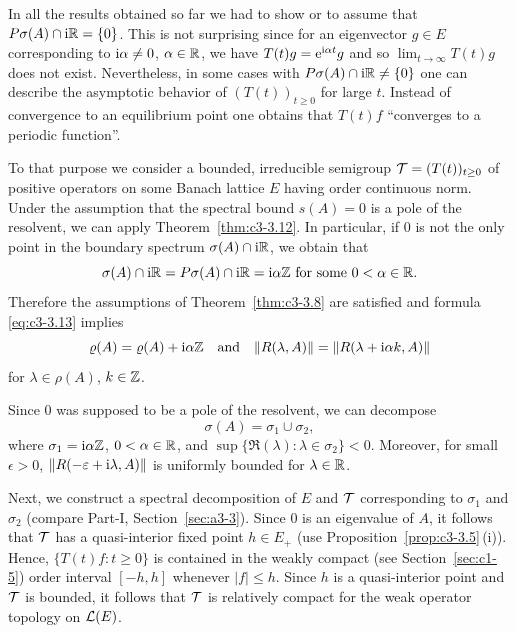 In all the results obtained so far we had to show or to assume that $P{\sigma}(A) \cap \mathrm{i}\mathbb{R} = \{0\}$.
This is not surprising since for an eigenvector $g \in E$ corresponding to $\mathrm{i}\alpha \neq 0$, $\alpha \in \mathbb{R}$, we have $T(t)g = \mathrm{e}^{\mathrm{i}\alpha t}g$ and so $\lim_{t\to\infty} T(t)g$ does not exist.
Nevertheless, in some cases with $P{\sigma}(A)\cap \mathrm{i}\mathbb{R} \neq \{0\}$ one can describe the asymptotic behavior of\/ $(T(t))_{t \geq 0}$ for large $t$.
Instead of convergence to an equilibrium point one obtains that $T(t)f$  \enquote{converges to a periodic function}.

To that purpose we consider a bounded, irreducible semigroup $\TT = (T(t))_{t \geq 0}$ of positive operators on some Banach lattice $E$ having order continuous norm.
Under the assumption that the spectral bound $s(A) = 0$ is a pole of the resolvent, we can apply Theorem~\ref{thm:c3-3.12}.
In particular, if\/ $0$ is not the only point in the boundary spectrum $\sigma(A)\cap \mathrm{i}\mathbb{R}$, we obtain that
\begin{equation*}\label{eq:c4-2.9-kgk}
\sigma(A)\cap \mathrm{i}\mathbb{R} = P{\sigma}(A)\cap \mathrm{i}\mathbb{R} = \mathrm{i}\alpha\mathbb{Z} \text{ for some } 0 < \alpha \in \mathbb{R}.
\end{equation*}
Therefore the assumptions of Theorem~\ref{thm:c3-3.8} are satisfied and formula \eqref{eq:c3-3.13} implies
\begin{equation}\label{eq:c4-2.10}
\rho(A) = \rho(A) + \im\alpha\Z \quad \text{and} \quad \|R(\lambda,A)\| = \|R(\lambda+\im\alpha k,A)\|
\end{equation}
for $\lambda \in \rho(A)$, $k \in \mathbb{Z}$.

Since $0$ was supposed to be a pole of the resolvent, we can decompose
\begin{equation*}\label{eq:c4-2.10-kgk}
\sigma(A) = \sigma_{1} \cup \sigma_{2},
\end{equation*}
where $\sigma_{1} = \mathrm{i}\alpha\mathbb{Z}$, $0 < \alpha \in \mathbb{R}$, and $\sup\{\Re(\lambda) \colon \lambda \in \sigma_{2}\} < 0$.
Moreover, for small $\epsilon > 0$, $\|R(-\epsilon+\im\lambda,A)\|$ is uniformly bounded for $\lambda \in \mathbb{R}$.

Next, we construct a spectral decomposition of\/ $E$ and $\mathcal{T}$ corresponding to $\sigma_{1}$ and $\sigma_{2}$ (compare Part-I, Section~\ref{sec:a3-3}).
Since $0$ is an eigenvalue of\/ $A$, it follows that $\mathcal{T}$ has a quasi-interior fixed point $h \in E_{+}$ (use Proposition~\ref{prop:c3-3.5}\,(i)).
Hence, $\{T(t)f \colon t \geq 0\}$ is contained in the weakly compact (see Section~\ref{sec:c1-5}) order interval $[-h,h]$ whenever $|f| \leq h$.
Since $h$ is a quasi-interior point and $\mathcal{T}$ is bounded, it follows that $\mathcal{T}$ is relatively compact for the weak operator topology on $\mathcal{L}(E)$.

